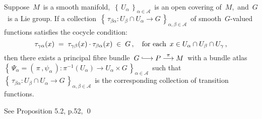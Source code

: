 
\vskip 0.5cm
\begin{proposition}
\mbox{}
\vskip 0.2cm
\noindent
Suppose \,$M$\, is a smooth manifold,
\,$\left\{\,U_{\alpha}\,\right\}_{\alpha\in\mathcal{A}}$\,
is an open covering of \,$M$,\, and
\,$G$\, is a Lie group.
If a collection
\,$\left\{\,\tau_{\beta\alpha} : U_{\beta} \cap U_{\alpha} \longrightarrow G\,\right\}_{\alpha,\beta\in\mathcal{A}}$\,
of smooth \,$G$-valued functions
satisfies the cocycle condition:
\begin{equation*}
\tau_{\gamma\alpha}(x) \; = \; \tau_{\gamma\beta}(x) \cdot \tau_{\beta\alpha}(x) \; \in \; G\,,
\quad
\textnormal{for each \,$x \in U_{\alpha} \cap U_{\beta} \cap U_{\gamma}$}\,,
\end{equation*}
then there exists a principal fibre bundle
\,$G \longhookrightarrow P \overset{\pi}{\longrightarrow} M$\,
with a bundle atlas
\,$\left\{\,\Psi_{\alpha} = (\,\pi\,,\psi_{\alpha}\,) : \pi^{-1}(U_{\alpha}) \longrightarrow U_{\alpha} \times G\,\right\}_{\alpha\in\mathcal{A}}$\,
such that
\,$\left\{\,\tau_{\beta\alpha} : U_{\beta} \cap U_{\alpha} \longrightarrow G\,\right\}_{\alpha,\beta\in\mathcal{A}}$\,
is the corresponding collection of transition functions.
\end{proposition}
\proof
See Proposition 5.2, p.52, \cite{Kobayashi1963v1}
\qed


